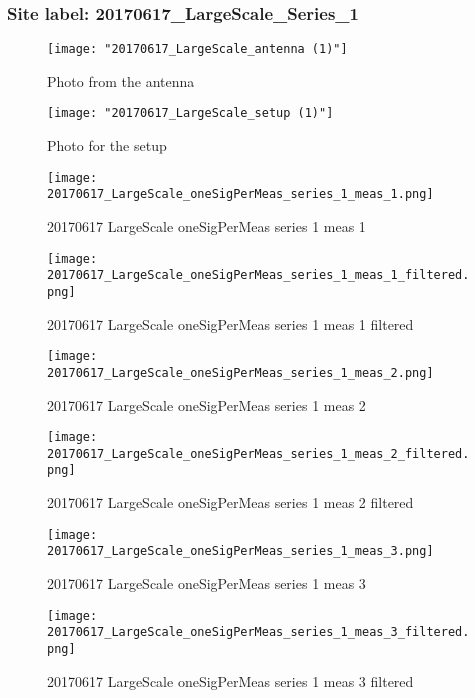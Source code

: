 \subsubsection{Site label: 20170617\_LargeScale\_Series\_1}
\begin{figure}[ht] \caption{Photo from the antenna}
\texttt{[image: "20170617\_LargeScale\_antenna (1)"]}\centering\end{figure}
\begin{figure}[ht] \caption{Photo for the setup}
\texttt{[image: "20170617\_LargeScale\_setup (1)"]}\centering\end{figure}
\begin{figure}[ht] \caption{20170617 LargeScale oneSigPerMeas series 1 meas 1}
\texttt{[image: 20170617\_LargeScale\_oneSigPerMeas\_series\_1\_meas\_1.png]}\centering\end{figure}
\begin{figure}[ht] \caption{20170617 LargeScale oneSigPerMeas series 1 meas 1 filtered}
\texttt{[image: 20170617\_LargeScale\_oneSigPerMeas\_series\_1\_meas\_1\_filtered.png]}\centering\end{figure}
\begin{figure}[ht] \caption{20170617 LargeScale oneSigPerMeas series 1 meas 2}
\texttt{[image: 20170617\_LargeScale\_oneSigPerMeas\_series\_1\_meas\_2.png]}\centering\end{figure}
\begin{figure}[ht] \caption{20170617 LargeScale oneSigPerMeas series 1 meas 2 filtered}
\texttt{[image: 20170617\_LargeScale\_oneSigPerMeas\_series\_1\_meas\_2\_filtered.png]}\centering\end{figure}
\begin{figure}[ht] \caption{20170617 LargeScale oneSigPerMeas series 1 meas 3}
\texttt{[image: 20170617\_LargeScale\_oneSigPerMeas\_series\_1\_meas\_3.png]}\centering\end{figure}
\begin{figure}[ht] \caption{20170617 LargeScale oneSigPerMeas series 1 meas 3 filtered}
\texttt{[image: 20170617\_LargeScale\_oneSigPerMeas\_series\_1\_meas\_3\_filtered.png]}\centering\end{figure}
\clearpage
